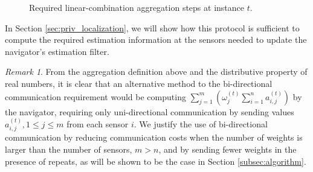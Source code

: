 \documentclass[10pt,letterpaper,oneside,twocolumn,journal]{IEEEtran}
\theoremstyle{definition}
\theoremstyle{definition}
\theoremstyle{remark}
\newtheorem*{remark}{Remark}
\begin{document}
\begin{figure}[htbp]
\vspace{\baselineskip}
\caption{Required linear-combination aggregation steps at instance $t$.}
\label{fig:agg_steps}
\end{figure}

In Section \ref{sec:priv_localization}, we will show how this protocol is sufficient to compute the required estimation information at the sensors needed to update the navigator's estimation filter.

\begin{remark}
    From the aggregation definition above and the distributive property of real numbers, it is clear that an alternative method to the bi-directional communication requirement would be computing $\sum^{m}_{j=1}(\omega_j^{(t)}\sum^{n}_{i=1} a_{i,j}^{(t)})$ by the navigator, requiring only uni-directional communication by sending values $a_{i,j}^{(t)}, 1 \leq j \leq m$ from each sensor $i$. We justify the use of bi-directional communication by reducing communication costs when the number of weights is larger than the number of sensors, $m>n$, and by sending fewer weights in the presence of repeats, as will be shown to be the case in Section \ref{subsec:algorithm}.
\end{remark}

% 
% 
\end{document}
